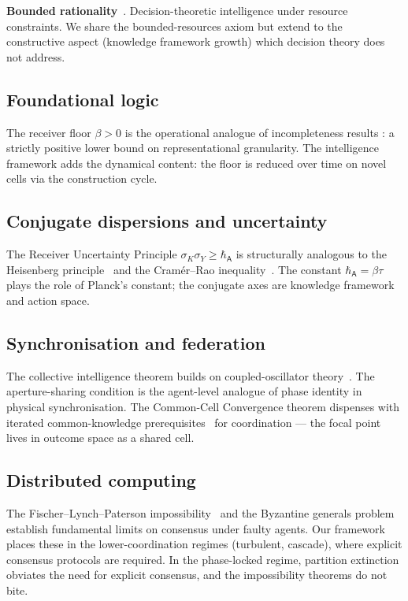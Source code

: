 \documentclass[11pt,twocolumn,a4paper]{article}
\newcommand{\agent}{\mathsf{A}}
\newcommand{\hbarA}{\hbar_{\agent}}
\begin{document}
\textbf{Bounded rationality}~\cite{simon1996,russellnorvig2020}. Decision-theoretic
intelligence under resource constraints. We share the bounded-resources axiom but extend
to the constructive aspect (knowledge framework growth) which decision theory does not
address.

\subsection{Foundational logic}

The receiver floor $\beta > 0$ is the operational analogue of incompleteness results
\cite{godel1931,tarski1933,turing1936,church1936,chaitin1974}: a strictly positive lower
bound on representational granularity. The intelligence framework adds the dynamical
content: the floor is reduced over time on novel cells via the construction cycle.

\subsection{Conjugate dispersions and uncertainty}

The Receiver Uncertainty Principle $\sigma_K \sigma_Y \ge \hbarA$ is structurally
analogous to the Heisenberg principle~\cite{heisenberg1927,robertson1929} and the
Cram\'er--Rao inequality~\cite{rao1945,cramer1946}. The constant $\hbarA = \beta \tau$
plays the role of Planck's constant; the conjugate axes are knowledge framework and
action space.

\subsection{Synchronisation and federation}

The collective intelligence theorem builds on coupled-oscillator
theory~\cite{kuramoto1984,strogatz2000,acebron2005,pikovsky2001}. The aperture-sharing
condition is the agent-level analogue of phase identity in physical synchronisation.
The Common-Cell Convergence theorem dispenses with iterated common-knowledge
prerequisites~\cite{aumann1976,fagin1995,lewis1969,schelling1960} for coordination ---
the focal point lives in outcome space as a shared cell.

\subsection{Distributed computing}

The Fischer--Lynch--Paterson impossibility~\cite{fischer1985} and the Byzantine
generals problem~\cite{lamport1982} establish fundamental limits on consensus under
faulty agents. Our framework places these in the lower-coordination regimes
(turbulent, cascade), where explicit consensus protocols are required. In the
phase-locked regime, partition extinction obviates the need for explicit consensus, and
the impossibility theorems do not bite.
\end{document}
